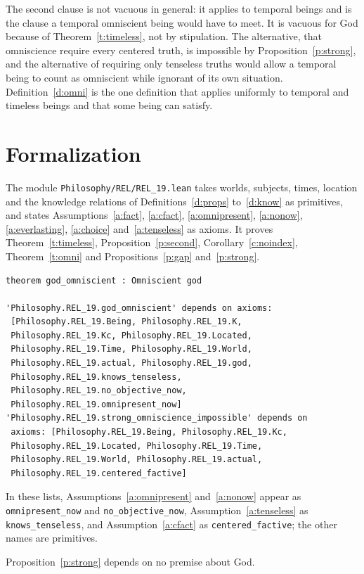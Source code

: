 \documentclass{situationist-preprint}
\begin{document}
\begin{reply}
The second clause is not vacuous in general: it applies to temporal beings and is the clause a temporal omniscient being would have to meet. It is vacuous for God because of Theorem~\ref{t:timeless}, not by stipulation. The alternative, that omniscience require every centered truth, is impossible by Proposition~\ref{p:strong}, and the alternative of requiring only tenseless truths would allow a temporal being to count as omniscient while ignorant of its own situation. Definition~\ref{d:omni} is the one definition that applies uniformly to temporal and timeless beings and that some being can satisfy.
\end{reply}


\section{Formalization}

The module \nolinkurl{Philosophy/REL/REL_19.lean} takes worlds, subjects, times, location and the knowledge relations of Definitions~\ref{d:props} to~\ref{d:know} as primitives, and states Assumptions~\ref{a:fact}, \ref{a:cfact}, \ref{a:omnipresent}, \ref{a:nonow}, \ref{a:everlasting}, \ref{a:choice} and~\ref{a:tenseless} as axioms. It proves Theorem~\ref{t:timeless}, Proposition~\ref{p:second}, Corollary~\ref{c:noindex}, Theorem~\ref{t:omni} and Propositions~\ref{p:gap} and~\ref{p:strong}.

\begin{lstlisting}
theorem god_omniscient : Omniscient god

'Philosophy.REL_19.god_omniscient' depends on axioms:
 [Philosophy.REL_19.Being, Philosophy.REL_19.K,
 Philosophy.REL_19.Kc, Philosophy.REL_19.Located,
 Philosophy.REL_19.Time, Philosophy.REL_19.World,
 Philosophy.REL_19.actual, Philosophy.REL_19.god,
 Philosophy.REL_19.knows_tenseless,
 Philosophy.REL_19.no_objective_now,
 Philosophy.REL_19.omnipresent_now]
'Philosophy.REL_19.strong_omniscience_impossible' depends on
 axioms: [Philosophy.REL_19.Being, Philosophy.REL_19.Kc,
 Philosophy.REL_19.Located, Philosophy.REL_19.Time,
 Philosophy.REL_19.World, Philosophy.REL_19.actual,
 Philosophy.REL_19.centered_factive]
\end{lstlisting}

{\sloppy In these lists, Assumptions~\ref{a:omnipresent} and~\ref{a:nonow} appear as \texttt{omnipresent\_now} and \texttt{no\_objective\_now}, Assumption~\ref{a:tenseless} as \texttt{knows\_tenseless}, and Assumption~\ref{a:cfact} as \texttt{centered\_factive}; the other names are primitives.\par} Proposition~\ref{p:strong} depends on no premise about God.
\end{document}
